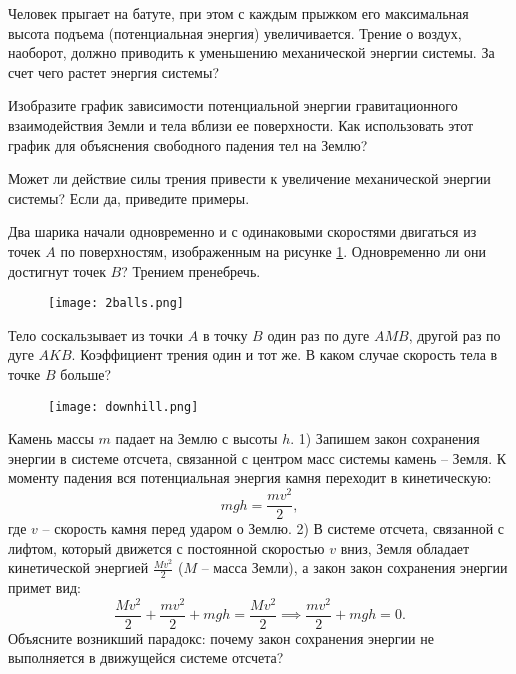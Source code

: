 \begin{ex}
Человек прыгает на батуте, при этом с каждым прыжком его максимальная высота подъема (потенциальная энергия) увеличивается. Трение о воздух, наоборот, должно приводить к уменьшению механической энергии системы. За счет чего растет энергия системы?
\end{ex}

\begin{ex}
Изобразите график зависимости потенциальной энергии гравитационного взаимодействия Земли и тела вблизи ее поверхности. Как использовать этот график для объяснения свободного падения тел на Землю?
\end{ex}

\begin{ex}
Может ли действие силы трения привести к увеличение механической энергии системы? Если да, приведите примеры. 
\end{ex}

\begin{ex}
Два шарика начали одновременно и с одинаковыми скоростями двигаться из точек $A$ по поверхностям, изображенным на рисунке  \ref{2balls}. Одновременно ли они достигнут точек $B$? Трением пренебречь.

\begin{figure}[h]
\centering
\texttt{[image: 2balls.png]}
\caption{}
\label{2balls}
\end{figure}
\end{ex}

\begin{ex}
Тело соскальзывает из точки $A$ в точку $B$ один раз по дуге $AMB$, другой раз по дуге $AKB$. Коэффициент трения один и тот же. В каком случае скорость тела в точке $B$ больше? 

\begin{figure}[h]
\centering
\texttt{[image: downhill.png]}
\caption{}
\label{downhill}
\end{figure}
\end{ex}

\begin{ex}
Камень массы $m$ падает на Землю с высоты $h$. 1) Запишем закон сохранения энергии в системе отсчета, связанной с центром масс системы камень -- Земля. К моменту падения вся потенциальная энергия камня переходит в кинетическую: $$ mgh = \frac{mv^2}{2},$$ где $v$ -- скорость камня перед ударом о Землю.
2) В системе отсчета, связанной с лифтом, который движется с постоянной скоростью $v$ вниз, Земля обладает кинетической энергией $\frac{Mv^2}{2}$ ($M$ -- масса Земли), а закон закон сохранения энергии примет вид: $$\frac{Mv^2}{2} + \frac{mv^2}{2} + mgh = \frac{Mv^2}{2} \implies \frac{mv^2}{2} + mgh = 0.$$ Объясните возникший парадокс: почему закон сохранения энергии не выполняется в движущейся системе отсчета?
\end{ex}


